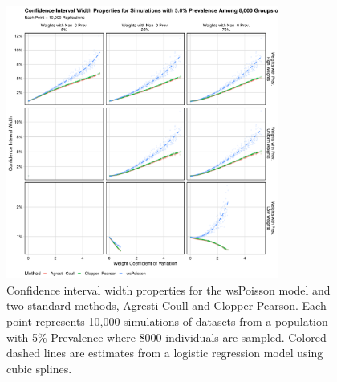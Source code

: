 \documentclass[AMA,STIX1COL]{WileyNJD-v2}
\begin{document}
\begin{figure}
\centering
\includegraphics[width=0.8\textwidth]{figures/perfect_confidence_interval_width_8000_groups_0_05_prev}
\caption{Confidence interval width properties for the wsPoisson model and two standard methods, Agresti-Coull and Clopper-Pearson.
Each point represents 10,000 simulations of datasets from a population with 5\% Prevalence where 8000 individuals are sampled.
Colored dashed lines are estimates from a logistic regression model using cubic splines.}
\label{fig:perfect_confidence_interval_width_8000_groups_0_05_prev}
\end{figure}

\end{document}
